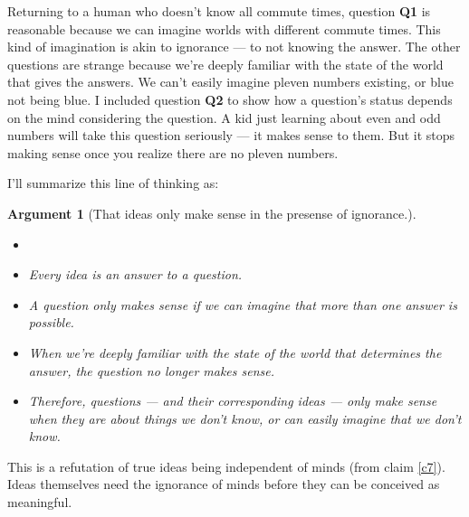 \documentclass[11pt, oneside]{article}   	%
\newtheorem{argt}{Argument}
\begin{document}
Returning to a human who doesn't know all commute times,
question {\bf Q1} is
reasonable because we can imagine worlds with different commute
times. This kind of imagination is akin to ignorance --- to not knowing the
answer.
The other questions are strange because we're deeply familiar with the state of
the world that gives the answers. We can't easily imagine pleven numbers
existing, or blue not being blue.
I included question {\bf Q2} to show how a question's status depends on the mind
considering the question. A kid just learning about even and odd numbers will
take this question seriously --- it makes sense to them. But it stops making
sense once you realize there are no pleven numbers.

I'll summarize this line of thinking as:
\begin{argt}[That ideas only make sense in the presense of ignorance.]
    \label{a3}
    \normalfont
    \begin{itemize}
        \item[]
        \item Every idea is an answer to a question.
        \item A question only makes sense if we can imagine that more than one
            answer is possible.
        \item When we're deeply familiar with the state of the world that
            determines the answer, the question no longer makes sense.
        \item Therefore, questions --- and their corresponding ideas --- only
            make sense when they are about things we don't know, or can easily
            imagine that we don't know.
    \end{itemize}
\end{argt}
This is a refutation of true ideas being independent of minds (from
claim \ref{c7}). Ideas themselves need the ignorance of minds before they can be
conceived as meaningful.
\end{document}
